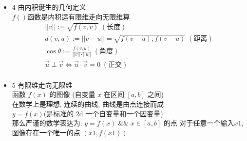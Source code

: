 \documentclass[12pt]{article}
\begin{document}
\begin{flushleft}
\begin{itemize}
              \vspace{0.3em}
              \textbf{3.4 正定性} \\
              $f(v,v) = x_{1}^{2} + y_{1}^{2}$ \\
              那么长度(模) \\
              $|v| = \sqrt{f(v,v)}$ \\
              正定性公理1: \\
              |v|如果存在意义 那么在数学定义中(根下不能为负): $f(v,v) \ge 0$  \\
              正定性公理2: \\
              如果 |v| = 0, 那么 v = 0 必然, 排除 不为0的向量, 长度为0的情况 。
              $f(v,v) = 0 \iff v = \mathbf{0}$
              \vspace{0.5em}
        \item 4 由内积诞生的几何定义 \\

              $f()$函数是内积运有限维走向无限维算 \\
              \begin{align}
                  ||v|| := \sqrt{f(v,v)}\;(\text{长度})                                 \\
                  d(v, u) := ||v - u|| = \sqrt{f(v-u), f(v-u)} \;(\text{距离})          \\
                  \cos \theta := \frac{f(v,u)}{||v|| \cdot||u||} \; (\text{角度})       \\
                  \vec{u} \perp \vec{v} \iff \vec{u} \cdot \vec{v} = 0 \; (\text{正交}) \\
              \end{align}
              \vspace{0.5em}
        \item 5 有限维走向无限维 \\

              函数 $f(x)$ 的图像 (自变量 $x$ 在区间 $[a, b]$ 之间) \\
              在数学上是理想, 连续的曲线, 曲线是由点连接而成 \\
              $y = f(x)$(是标准的 2d 一个自变量和一个因变量) \\
              那么严谨的数学表达为: $y = f(x)  \;\&\&\;  x \in [a, b]$ 的点 对于任意一个输入$x1$, 图像存在一个唯一的点 $(x1,f(x1))$ \\


\end{itemize}
\end{flushleft}
\end{document}
